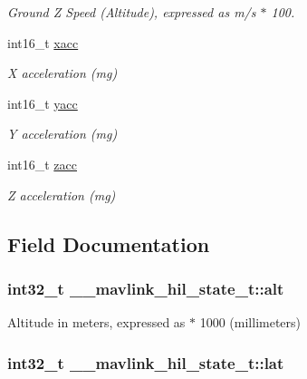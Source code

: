 \begin{DoxyCompactItemize}
\begin{DoxyCompactList}\small\item\em Ground Z Speed (Altitude), expressed as m/s $\ast$ 100. \end{DoxyCompactList}\item 
int16\+\_\+t \hyperlink{struct____mavlink__hil__state__t_a8497c1e566b9acb1d4298090c480a212}{xacc}
\begin{DoxyCompactList}\small\item\em X acceleration (mg) \end{DoxyCompactList}\item 
int16\+\_\+t \hyperlink{struct____mavlink__hil__state__t_a670623660d6d3d15121b2698082e8f55}{yacc}
\begin{DoxyCompactList}\small\item\em Y acceleration (mg) \end{DoxyCompactList}\item 
int16\+\_\+t \hyperlink{struct____mavlink__hil__state__t_a79b626e6b13844d733a6a6c02e506b90}{zacc}
\begin{DoxyCompactList}\small\item\em Z acceleration (mg) \end{DoxyCompactList}\end{DoxyCompactItemize}


\subsection{Field Documentation}
\hypertarget{struct____mavlink__hil__state__t_a8f4ac2f2f4948df71b4abbb50d7c2f2f}{
\subsubsection[{alt}]{\setlength{\rightskip}{0pt plus 5cm}int32\+\_\+t \+\_\+\+\_\+mavlink\+\_\+hil\+\_\+state\+\_\+t\+::alt}}\label{struct____mavlink__hil__state__t_a8f4ac2f2f4948df71b4abbb50d7c2f2f}


Altitude in meters, expressed as $\ast$ 1000 (millimeters) 

\hypertarget{struct____mavlink__hil__state__t_afb2b29710c1a8b69503e35a72473c6d3}{
\subsubsection[{lat}]{\setlength{\rightskip}{0pt plus 5cm}int32\+\_\+t \+\_\+\+\_\+mavlink\+\_\+hil\+\_\+state\+\_\+t\+::lat}}\label{struct____mavlink__hil__state__t_afb2b29710c1a8b69503e35a72473c6d3}


